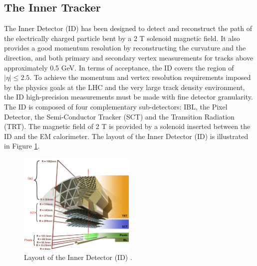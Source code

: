 \subsection{The Inner Tracker}
\label{chap2:ATLAS:ITk}
The Inner Detector (ID) has been designed to detect and reconstruct the path of the electrically charged particle bent by a 2 T solenoid magnetic field. It also provides a good momentum resolution by reconstructing the curvature and the direction, and both primary and secondary vertex measurements for tracks above approximately 0.5 GeV\cite{ID_TRD, TrkVertexing}. In terms of acceptance, the ID covers the region of $|\eta|\leqslant2.5$. To achieve the momentum and vertex resolution requirements imposed by the physics goals at the LHC and the very large track density environment, the ID high-precision measurements must be made with fine detector granularity. The ID is composed of four complementary sub-detectors: IBL, the Pixel Detector, the Semi-Conductor Tracker (SCT) and the Transition Radiation (TRT). The magnetic field of 2 T is provided by a solenoid inserted between the ID and the EM calorimeter. The layout of the Inner Detector (ID) is illustrated in Figure \ref{fig:chap2:ATLAS:ITK:ID}.
\begin{figure}[htbp]
    \centering
    \includegraphics[width=0.5\textwidth]{Ch2/Img/ID_withIBL.png}
    \caption{Layout of the Inner Detector (ID) \cite{ID_withIBL}.}
    \label{fig:chap2:ATLAS:ITK:ID}
\end{figure}


